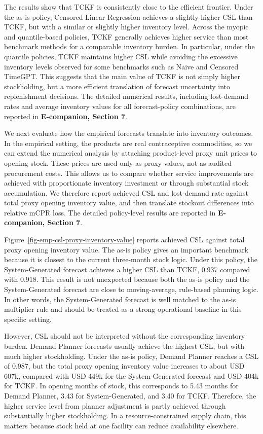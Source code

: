 \documentclass[
  11pt,
  authoryear,
  doubleblind,
  3p]{elsarticle}
\begin{document}
The results show that TCKF is consistently close to the efficient
frontier. Under the as-is policy, Censored Linear Regression achieves a
slightly higher CSL than TCKF, but with a similar or slightly higher
inventory level. Across the myopic and quantile-based policies, TCKF
generally achieves higher service than most benchmark methods for a
comparable inventory burden. In particular, under the quantile policies,
TCKF maintains higher CSL while avoiding the excessive inventory levels
observed for some benchmarks such as Naive and Censored TimeGPT. This
suggests that the main value of TCKF is not simply higher stockholding,
but a more efficient translation of forecast uncertainty into
replenishment decisions. The detailed numerical results, including
lost-demand rates and average inventory values for all forecast-policy
combinations, are reported in \textbf{E-companion, Section 7}.

We next evaluate how the empirical forecasts translate into inventory
outcomes. In the empirical setting, the products are real contraceptive
commodities, so we can extend the numerical analysis by attaching
product-level proxy unit prices to opening stock. These prices are used
only as proxy values, not as audited procurement costs. This allows us
to compare whether service improvements are achieved with proportionate
inventory investment or through substantial stock accumulation. We
therefore report achieved CSL and lost-demand rate against total proxy
opening inventory value, and then translate stockout differences into
relative mCPR loss. The detailed policy-level results are reported in
\textbf{E-companion, Section 7}.

Figure~\ref{fig-emp-csl-proxy-inventory-value} reports achieved CSL
against total proxy opening inventory value. The as-is policy gives an
important benchmark because it is closest to the current three-month
stock logic. Under this policy, the System-Generated forecast achieves a
higher CSL than TCKF, 0.937 compared with 0.918. This result is not
unexpected because both the as-is policy and the System-Generated
forecast are close to moving-average, rule-based planning logic. In
other words, the System-Generated forecast is well matched to the as-is
multiplier rule and should be treated as a strong operational baseline
in this specific setting.

However, CSL should not be interpreted without the corresponding
inventory burden. Demand Planner forecasts usually achieve the highest
CSL, but with much higher stockholding. Under the as-is policy, Demand
Planner reaches a CSL of 0.987, but the total proxy opening inventory
value increases to about USD 607k, compared with USD 449k for the
System-Generated forecast and USD 404k for TCKF. In opening months of
stock, this corresponds to 5.43 months for Demand Planner, 3.43 for
System-Generated, and 3.40 for TCKF. Therefore, the higher service level
from planner adjustment is partly achieved through substantially higher
stockholding. In a resource-constrained supply chain, this matters
because stock held at one facility can reduce availability elsewhere.
\end{document}
